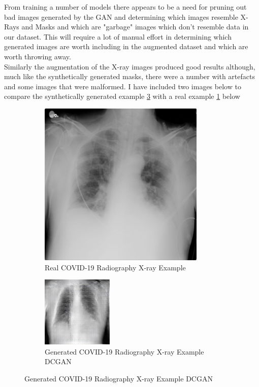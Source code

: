 From training a number of models there appears to be a need for pruning out bad images generated by the GAN and determining which images resemble X-Rays and Masks and which are "garbage" images which don't resemble data in our dataset.  This will require a lot of manual effort in determining which generated images are worth including in the augmented dataset and which are worth throwing away.
\\
Similarly the augmentation of the X-ray images produced good results although, much like the synthetically generated masks, there were a number with artefacts and some images that were malformed.  I have included two images below to compare the synthetically generated example \ref{fig:Synthetically Generated COVID-19 Radiography X-ray(DCGAN)}  with a real example \ref{fig:Real COVID-19 Radiography X-ray Example} below
 \begin{figure}[H]
    \centering
    \begin{subfigure}{.35\textwidth}
    \centering
      \includegraphics[width=.4\linewidth,keepaspectratio]{Images/ExampleofXrayRadiographyCOVID19.png}
      \caption{Real COVID-19 Radiography X-ray Example}
      \label{fig:Real COVID-19 Radiography X-ray Example}
    \end{subfigure}\hfill%
    \begin{subfigure}{.35\textwidth}
    \centering
      \includegraphics[width=.4\linewidth,keepaspectratio]{Images/SyntheticRadiographyXrayCOVID19Example.png}
      \caption{Generated COVID-19 Radiography X-ray Example DCGAN}
      \label{fig:Synthetically Generated COVID-19 Radiography X-ray(DCGAN)}
    \end{subfigure}\hfill%
\end{figure}
